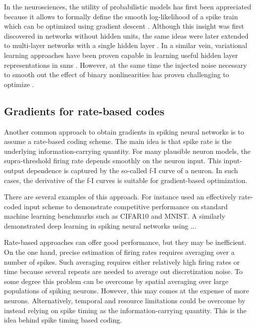 \documentclass[journal,onecolumn,11pt]{IEEEtran}
\begin{document}
In the neurosciences, the utility of probabilistic models 
has first been appreciated because it allows to formally define the smooth
log-likelihood of a spike train which can be optimized using gradient descent
\cite{pfister_optimal_2006}.
Although this insight was first discovered in networks without hidden units,
the same ideas were later extended to multi-layer networks with a single hidden
layer \cite{gardner_learning_2015}.
In a similar vein, variational learning approaches have been proven capable
in learning useful hidden layer representations in \glspl{snn}
\cite{brea_matching_2013, rezende_stochastic_2014,Mostafa_Cauwenberghs18}.
However, at the same time the injected noise necessary to smooth out the effect
of binary nonlinearities has proven challenging to optimize
\cite{rezende_stochastic_2014}.


\subsection{Gradients for rate-based codes}

Another common approach to obtain gradients in spiking neural networks is to
assume a rate-based coding scheme.
The main idea is that spike rate is the underlying information-carrying quantity.
For many plausible neuron models, the supra-threshold firing rate depends
smoothly on the neuron input. This input-output dependence is captured by the
so-called f-I curve of a neuron.
In such cases, the derivative of the f-I curves is suitable for gradient-based optimization. 


There are several examples of this approach. 
For instance \citet{Hunsberger_Eliasmith15_spikdeep} used an effectively
rate-coded input scheme to demonstrate competitive performance on standard
machine learning benchmarks such as CIFAR10 and MNIST.
A similarly \cite{Lee_etal16_traideep} demonstrated deep learning in spiking
neural networks using ... %

Rate-based approaches can offer good performance, but they may be inefficient.
On the one hand, precise estimation of firing rates requires averaging over
a number of spikes.  Such averaging requires either relatively high firing rates or
time because several repeats are needed to average out discretization noise.  
To some degree this problem can be overcome by spatial averaging over
large populations of spiking neurons. However, this may comes at the expense of
more neurons. 
Alternatively, temporal and resource limitations could be overcome by instead relying on
spike timing as the information-carrying quantity. This is the idea behind
spike timing based coding.
\end{document}
